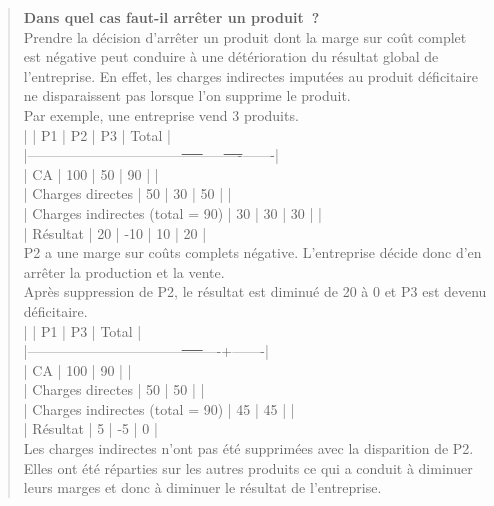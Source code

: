 \documentclass{tufte-handout}
\begin{document}
\begin{verse}
\textbf{Dans quel cas faut-il arrêter un produit ?}\\
Prendre la décision d'arrêter un produit dont la marge sur coût complet est négative peut conduire à une détérioration du résultat global de l'entreprise. En effet, les charges indirectes imputées au produit déficitaire ne disparaissent pas lorsque l'on supprime le produit.\\
\vspace*{1em}
Par exemple, une entreprise vend 3 produits.\\
\vspace*{1em}
|                                 |  P1 |  P2 | P3 | Total |\\
|---------------------------------\sout{-----}-----\sout{----}-------|\\
| CA                              | 100 |  50 | 90 |       |\\
| Charges directes                |  50 |  30 | 50 |       |\\
| Charges indirectes (total = 90) |  30 |  30 | 30 |       |\\
| Résultat                        |  20 | -10 | 10 |  20   |\\
\vspace*{1em}
P2 a une marge sur coûts complets négative. L'entreprise décide donc d'en arrêter la production et la vente.\\
\vspace*{1em}
Après suppression de P2, le résultat est diminué de 20 à 0 et P3 est devenu déficitaire.\\
\vspace*{1em}
|                                 |  P1 | P3 | Total |\\
|---------------------------------\sout{-----}----+-------|\\
| CA                              | 100 | 90 |       |\\
| Charges directes                |  50 | 50 |       |\\
| Charges indirectes (total = 90) |  45 | 45 |       |\\
| Résultat                        |   5 | -5 |    0  |\\
\vspace*{1em}
Les charges indirectes n'ont pas été supprimées avec la disparition de P2. Elles ont été réparties sur les autres produits ce qui a conduit à diminuer leurs marges et donc à diminuer le résultat de l'entreprise.\\

\end{verse}
\end{document}
